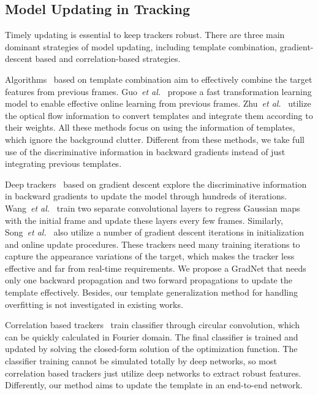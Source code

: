 \documentclass[10pt,twocolumn,letterpaper]{article}
\begin{document}
\subsection{Model Updating in Tracking}
Timely updating is essential to keep trackers robust. There are three main dominant strategies of model updating, including template combination, gradient-descent based and correlation-based strategies.

\vspace{-4pt}
{}
Algorithms~\cite{Guo-dsiam-iccv2017, zhu-flowtracker-eccv18} based on template combination aim to effectively combine the target features from previous frames.
Guo~\emph{et al.}~\cite{Guo-dsiam-iccv2017} propose a fast transformation learning model
to enable effective online learning from previous frames.
Zhu~\emph{et al.}~\cite{zhu-flowtracker-eccv18} utilize the optical flow information to convert templates and integrate them according to their weights.
All these methods focus on using the information of templates, which ignore the background clutter.
Different from these methods, we take full use of the discriminative information in backward gradients
instead of just integrating previous templates.

\vspace{-4pt}
{}
Deep trackers~\cite{Wang-ICCV15-FCNT, crest-iccv2017} based on gradient descent explore the discriminative information in backward gradients to update the model through hundreds of iterations.
Wang~\emph{et al.}~\cite{Wang-ICCV15-FCNT} train two separate convolutional layers to regress Gaussian maps with the initial frame and update these layers every few frames.
Similarly, Song~\emph{et al.}~\cite{crest-iccv2017} also utilize a number of gradient descent iterations in initialization and online update procedures.
These trackers need many training iterations to capture the appearance variations of the target, which makes the tracker less effective and far from real-time requirements.
We propose a GradNet that needs only one backward propagation and two forward propagations to update the template effectively. Besides, our template generalization method for handling overfitting is not investigated in existing works.

\vspace{-4pt}
{}
Correlation based trackers~\cite{Henriques-TPAMI15-KCF, Ma-ICCV15-HCFT, Danelljan-ECCV16-C-COT,MCPF_TPAMI19,CPF_TIP19,ASRCF} train classifier through circular convolution, which can be quickly calculated in Fourier domain.
The final classifier is trained and updated by solving the closed-form solution of the optimization function.
The classifier training cannot be simulated totally by deep networks, so most correlation based trackers just utilize deep networks to extract robust features.
Differently, our method aims to update the template in an end-to-end network.
\end{document}
